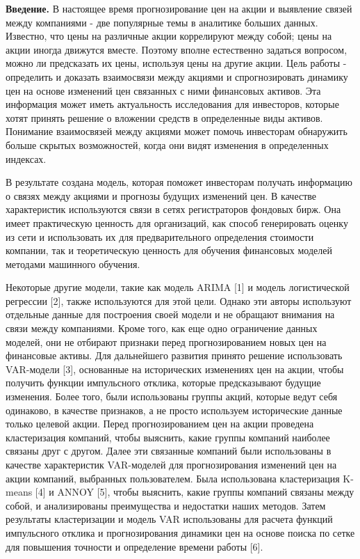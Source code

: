 \begin{multicols}{2}
{\bfseries Введение.} В настоящее время прогнозирование цен на акции и
выявление связей между компаниями - две популярные темы в аналитике
больших данных. Известно, что цены на различные акции коррелируют между
собой; цены на акции иногда движутся вместе. Поэтому вполне естественно
задаться вопросом, можно ли предсказать их цены, используя цены на
другие акции. Цель работы - определить и доказать взаимосвязи между
акциями и спрогнозировать динамику цен на основе изменений цен связанных
с ними финансовых активов. Эта информация может иметь актуальность
исследования для инвесторов, которые хотят принять решение о вложении
средств в определенные виды активов. Понимание взаимосвязей между
акциями может помочь инвесторам обнаружить больше скрытых возможностей,
когда они видят изменения в определенных индексах.

В результате создана модель, которая поможет инвесторам получать
информацию о связях между акциями и прогнозы будущих изменений цен. В
качестве характеристик используются связи в сетях регистраторов фондовых
бирж. Она имеет практическую ценность для организаций, как способ
генерировать оценку из сети и использовать их для предварительного
определения стоимости компании, так и теоретическую ценность для
обучения финансовых моделей методами машинного обучения.

Некоторые другие модели, такие как модель ARIMA {[}1{]} и модель
логистической регрессии {[}2{]}, также используются для этой цели.
Однако эти авторы используют отдельные данные для построения своей
модели и не обращают внимания на связи между компаниями. Кроме того, как
еще одно ограничение данных моделей, они не отбирают признаки перед
прогнозированием новых цен на финансовые активы. Для дальнейшего
развития принято решение использовать VAR-модели {[}3{]}, основанные на
исторических изменениях цен на акции, чтобы получить функции импульсного
отклика, которые предсказывают будущие изменения. Более того, были
использованы группы акций, которые ведут себя одинаково, в качестве
признаков, а не просто используем исторические данные только целевой
акции. Перед прогнозированием цен на акции проведена кластеризация
компаний, чтобы выяснить, какие группы компаний наиболее связаны друг с
другом. Далее эти связанные компаний были использованы в качестве
характеристик VAR-моделей для прогнозирования изменений цен на акции
компаний, выбранных пользователем. Была использована кластеризация
K-means {[}4{]} и ANNOY {[}5{]}, чтобы выяснить, какие группы компаний
связаны между собой, и анализированы преимущества и недостатки наших
методов. Затем результаты кластеризации и модель VAR использованы для
расчета функций импульсного отклика и прогнозирования динамики цен на
основе поиска по сетке для повышения точности и определение времени
работы {[}6{]}.


\end{multicols}
